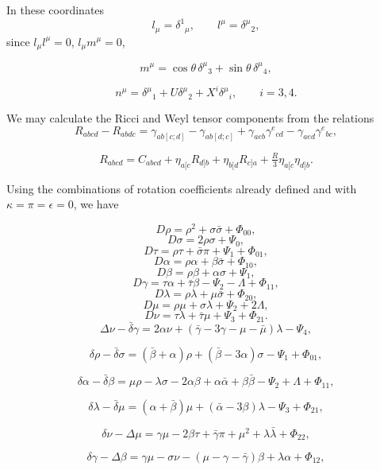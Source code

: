 In these coordinates
\[
l_{\mu} = \delta^{1}{}_{\mu}, \qquad l^{\mu} = \delta^{\mu}{}_{2},
\]
since $l_{\mu} l^{\mu} = 0$, $l_{\mu} m^{\mu} = 0$,  

\[
m^{\mu} = \cos\theta\, \delta^{\mu}{}_{3} + \sin\theta\, \delta^{\mu}{}_{4},
\]

\[
n^{\mu} = \delta^{\mu}{}_{1} + U \delta^{\mu}{}_{2} + X^{i} \delta^{\mu}{}_{i}, 
\qquad i=3,4. \tag{3.7}
\]

We may calculate the Ricci and Weyl tensor components from 
the relations
\[
R_{abcd} - R_{abdc} = \gamma_{ab[c;d]} - \gamma_{ab[d;c]}
+ \gamma_{aeb}\gamma^{e}{}_{cd} - \gamma_{aed}\gamma^{e}{}_{bc}, \tag{3.8}
\]

\[
R_{abcd} = C_{abcd} + \eta_{a[c}R_{d]b} + \eta_{b[d}R_{c]a}
+ \tfrac{R}{3}\eta_{a[c}\eta_{d]b}. \tag{3.9}
\]

Using the combinations of rotation coefficients already 
defined and with $\kappa = \pi = \epsilon = 0$, we have

\[
D\rho = \rho^{2} + \sigma \bar{\sigma} + \Phi_{00}, \tag{3.10}
\]
\[
D\sigma = 2\rho\sigma + \Psi_{0}, \tag{3.11}
\]
\[
D\tau = \rho\tau + \bar{\sigma}\pi + \Psi_{1} + \Phi_{01}, \tag{3.12}
\]
\[
D\alpha = \rho\alpha + \beta\bar{\sigma} + \Phi_{10}, \tag{3.13}
\]
\[
D\beta = \rho\beta + \alpha\sigma + \Psi_{1}, \tag{3.14}
\]
\[
D\gamma = \tau\alpha + \bar{\tau}\beta - \Psi_{2} - \Lambda + \Phi_{11}, \tag{3.15}
\]
\[
D\lambda = \rho\lambda + \mu\bar{\sigma} + \Phi_{20}, \tag{3.16}
\]
\[
D\mu = \rho\mu + \sigma\lambda + \Psi_{2} + 2\Lambda, \tag{3.17}
\]
\[
D\nu = \tau\lambda + \bar{\tau}\mu + \Psi_{3} + \Phi_{21}. \tag{3.18}
\]
\[
\Delta \nu - \bar{\delta}\gamma = 2\alpha \nu + (\bar{\gamma} - 3\gamma - \mu - \bar{\mu})\lambda - \Psi_{4}, \tag{3.19}
\]

\[
\delta \rho - \bar{\delta}\sigma = (\bar{\beta} + \alpha)\rho + (\bar{\beta} - 3\alpha)\sigma - \Psi_{1} + \Phi_{01}, \tag{3.20}
\]

\[
\delta \alpha - \bar{\delta}\beta = \mu\rho - \lambda\sigma - 2\alpha\beta + \alpha\bar{\alpha} + \beta\bar{\beta} - \Psi_{2} + \Lambda + \Phi_{11}, \tag{3.21}
\]

\[
\delta \lambda - \bar{\delta}\mu = (\alpha + \bar{\beta})\mu + (\bar{\alpha} - 3\beta)\lambda - \Psi_{3} + \Phi_{21}, \tag{3.22}
\]

\[
\delta \nu - \Delta \mu = \gamma\mu - 2\beta\tau + \bar{\gamma}\pi + \mu^{2} + \lambda\bar{\lambda} + \Phi_{22}, \tag{3.23}
\]

\[
\delta \gamma - \Delta \beta = \gamma\mu - \sigma\nu - (\mu - \gamma - \bar{\gamma})\beta + \lambda\alpha + \Phi_{12}, \tag{3.24}
\]

